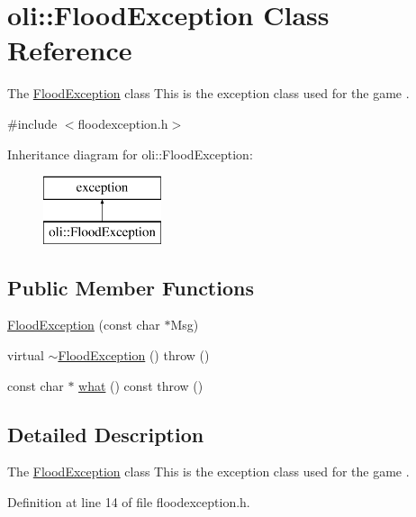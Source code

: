 \hypertarget{classoli_1_1_flood_exception}{}\section{oli\+:\+:Flood\+Exception Class Reference}
\label{classoli_1_1_flood_exception}


The \hyperlink{classoli_1_1_flood_exception}{Flood\+Exception} class This is the exception class used for the game .  




{\ttfamily \#include $<$floodexception.\+h$>$}

Inheritance diagram for oli\+:\+:Flood\+Exception\+:\begin{figure}[H]
\begin{center}
\leavevmode
\includegraphics[height=2.000000cm]{classoli_1_1_flood_exception}
\end{center}
\end{figure}
\subsection*{Public Member Functions}
\begin{DoxyCompactItemize}
\item 
\hyperlink{classoli_1_1_flood_exception_a98d7a32c0eef6440e94cae847fa0c4ba}{Flood\+Exception} (const char $\ast$Msg)
\item 
virtual \hyperlink{classoli_1_1_flood_exception_a7c5320db13b3e5c1082ab933a6dd0bd0}{$\sim$\+Flood\+Exception} ()  throw ()
\item 
const char $\ast$ \hyperlink{classoli_1_1_flood_exception_a03204c3d2890b5de6690df657b770f72}{what} () const  throw ()
\end{DoxyCompactItemize}


\subsection{Detailed Description}
The \hyperlink{classoli_1_1_flood_exception}{Flood\+Exception} class This is the exception class used for the game . 

Definition at line 14 of file floodexception.\+h.



